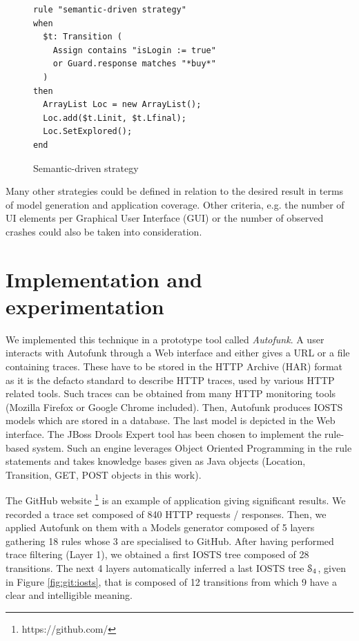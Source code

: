 \begin{figure}[h]
\begin{framed}
\begin{BVerbatim}
rule "semantic-driven strategy"
when
  $t: Transition (
    Assign contains "isLogin := true"
    or Guard.response matches "*buy*"
  )
then
  ArrayList Loc = new ArrayList();
  Loc.add($t.Linit, $t.Lfinal);
  Loc.SetExplored();
end
\end{BVerbatim}
\end{framed}

\caption{Semantic-driven strategy}
\label{fig:rule:semdriven}
\end{figure}

Many other strategies could be defined in relation to the desired
result in terms of model generation and application coverage.
Other criteria, e.g. the number of UI elements per Graphical User
Interface (GUI) or the number of observed crashes could also be
taken into consideration.


\section{Implementation and experimentation}
\label{sec:modelinf:webapps:exp}

We implemented this technique in a prototype tool called
\emph{Autofunk}. A user interacts with Autofunk through a Web
interface and either gives a URL  or a file containing traces.
These have to be stored in the HTTP Archive (HAR) format as it is
the defacto standard to describe HTTP traces, used by various
HTTP related tools. Such traces can be obtained from many HTTP
monitoring tools (Mozilla Firefox or Google Chrome included).
Then, Autofunk produces IOSTS models which are stored in a
database. The last model is depicted in the Web interface. The
JBoss Drools Expert tool has been chosen to implement the
rule-based system. Such an engine leverages Object Oriented
Programming in the rule statements and takes knowledge bases
given as Java objects (Location, Transition, GET, POST objects in
this work).

The GitHub website \footnote{https://github.com/} is an example
of application giving significant results. We recorded a trace
set composed of 840 HTTP requests / responses. Then, we applied
Autofunk on them with a Models generator composed of 5 layers
gathering 18 rules whose 3 are specialised to GitHub. After
having performed trace filtering (Layer 1), we obtained a first
IOSTS tree composed of 28 transitions. The next 4 layers
automatically inferred a last IOSTS tree $\EuScript{S}_4$, given
in Figure \ref{fig:git:iosts}, that is composed of 12 transitions
from which 9 have a clear and intelligible meaning.

